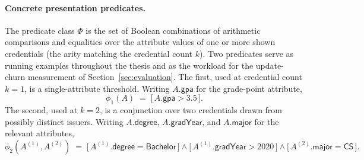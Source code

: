 \begin{construction}
\paragraph{Concrete presentation predicates.}\label{par:phi-examples}
The predicate class $\Phi$ is the set of Boolean combinations of arithmetic comparisons and equalities over the attribute values of one or more shown credentials (the arity matching the credential count $k$). Two predicates serve as running examples throughout the thesis and as the workload for the update-churn measurement of Section~\ref{sec:evaluation}. The first, used at credential count $k=1$, is a single-attribute threshold. Writing $A.\mathsf{gpa}$ for the grade-point attribute,
\begin{equation*}
  \phi_1(A)\;=\;\bigl[\,A.\mathsf{gpa}>3.5\,\bigr].
\end{equation*}
The second, used at $k=2$, is a conjunction over two credentials drawn from
possibly distinct issuers. Writing $A.\mathsf{degree}$, $A.\mathsf{gradYear}$,
and $A.\mathsf{major}$ for the relevant attributes,
\begin{equation*}
  \phi_2(A^{(1)},A^{(2)})\;=\;
  \bigl[\,A^{(1)}.\mathsf{degree}=\textsf{Bachelor}\,\bigr]
  \wedge
  \bigl[\,A^{(1)}.\mathsf{gradYear}>2020\,\bigr]
  \wedge
  \bigl[\,A^{(2)}.\mathsf{major}=\textsf{CS}\,\bigr].
\end{equation*}

\end{construction}
